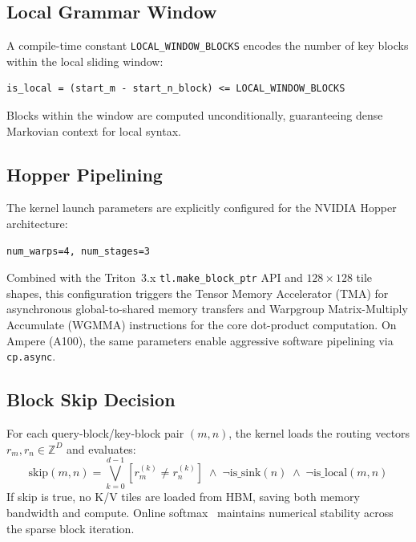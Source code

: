 \documentclass[11pt,a4paper]{article}
\begin{document}
\subsection{Local Grammar Window}

A compile-time constant \texttt{LOCAL\_WINDOW\_BLOCKS} encodes the number of key blocks within the local sliding window:
\begin{verbatim}
is_local = (start_m - start_n_block) <= LOCAL_WINDOW_BLOCKS
\end{verbatim}
Blocks within the window are computed unconditionally, guaranteeing dense Markovian context for local syntax.

\subsection{Hopper Pipelining}

The kernel launch parameters are explicitly configured for the NVIDIA Hopper architecture:
\begin{verbatim}
num_warps=4, num_stages=3
\end{verbatim}
Combined with the Triton~3.x \texttt{tl.make\_block\_ptr} API and $128 \times 128$ tile shapes, this configuration triggers the Tensor Memory Accelerator (TMA) for asynchronous global-to-shared memory transfers and Warpgroup Matrix-Multiply Accumulate (WGMMA) instructions for the core dot-product computation. On Ampere (A100), the same parameters enable aggressive software pipelining via \texttt{cp.async}.

\subsection{Block Skip Decision}

For each query-block/key-block pair $(m, n)$, the kernel loads the routing vectors $r_m, r_n \in \mathbb{Z}^D$ and evaluates:
\begin{equation}
    \text{skip}(m, n) = \bigvee_{k=0}^{d-1} \left[r_m^{(k)} \neq r_n^{(k)}\right] \;\wedge\; \neg\text{is\_sink}(n) \;\wedge\; \neg\text{is\_local}(m, n)
\end{equation}
If skip is true, no K/V tiles are loaded from HBM, saving both memory bandwidth and compute. Online softmax~\citep{milakov2018softmax} maintains numerical stability across the sparse block iteration.

\end{document}
